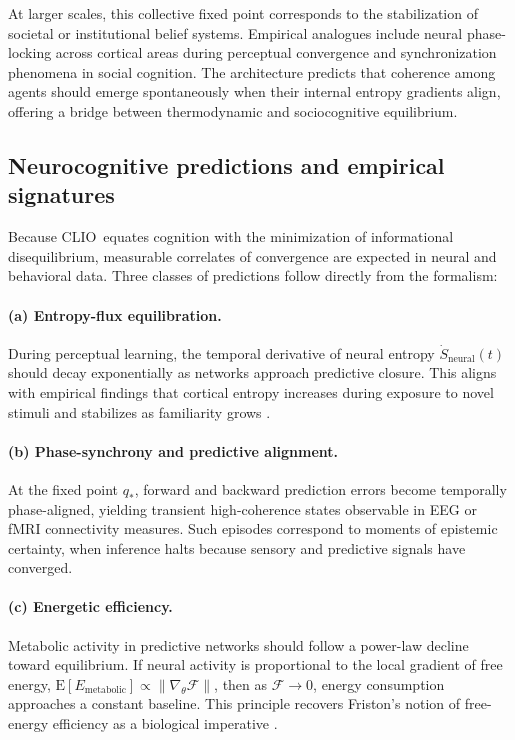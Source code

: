 \documentclass[12pt,a4paper]{article}
\newcommand{\CLIO}{CLIO}              %
\theoremstyle{plain}
\begin{document}
At larger scales, this collective fixed point corresponds to the stabilization of societal or institutional belief systems.
Empirical analogues include neural phase-locking across cortical areas during perceptual convergence and synchronization phenomena in social cognition.  
The architecture predicts that coherence among agents should emerge spontaneously when their internal entropy gradients align, offering a bridge between thermodynamic and sociocognitive equilibrium.

\subsection{Neurocognitive predictions and empirical signatures}
\label{sec:neuro-predictions}

Because \CLIO\ equates cognition with the minimization of informational disequilibrium, measurable correlates of convergence are expected in neural and behavioral data.
Three classes of predictions follow directly from the formalism:

\paragraph{(a) Entropy-flux equilibration.}
During perceptual learning, the temporal derivative of neural entropy \( \dot{S}_{\text{neural}}(t) \) should decay exponentially as networks approach predictive closure.
This aligns with empirical findings that cortical entropy increases during exposure to novel stimuli and stabilizes as familiarity grows \citep{kanai2024entropy}.

\paragraph{(b) Phase-synchrony and predictive alignment.}
At the fixed point \(q_*\), forward and backward prediction errors become temporally phase-aligned, yielding transient high-coherence states observable in EEG or fMRI connectivity measures.
Such episodes correspond to moments of epistemic certainty, when inference halts because sensory and predictive signals have converged.

\paragraph{(c) Energetic efficiency.}
Metabolic activity in predictive networks should follow a power-law decline toward equilibrium.
If neural activity is proportional to the local gradient of free energy,
\(\mathrm{E}[E_{\text{metabolic}}] \propto \|\nabla_\theta \mathcal{F}\|\),
then as \(\mathcal{F}\to 0\), energy consumption approaches a constant baseline.
This principle recovers Friston’s notion of free-energy efficiency as a biological imperative \citep{friston2023active,friston2025beautiful}.
\end{document}

